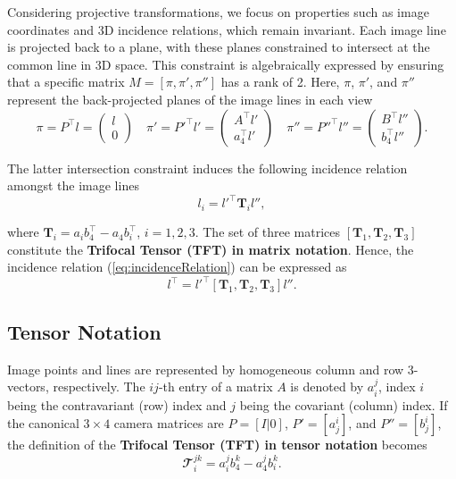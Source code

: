 Considering projective transformations, we focus on properties such as image coordinates and 3D incidence relations, which remain invariant. Each image line is projected back to a plane, with these planes constrained to intersect at the common line in 3D space. This constraint is algebraically expressed by ensuring that a specific matrix \( M = [\pi, \pi', \pi''] \) has a rank of 2. Here, \( \pi \), \( \pi' \), and \( \pi'' \) represent the back-projected planes of the image lines in each view
\begin{equation}
	\pi = P^\top l = \left( \begin{array}{c} l \\ 0 \end{array} \right) \quad
	\pi' = P'^\top l' = \left( \begin{array}{c} A^\top l' \\ a_4^\top l' \end{array} \right) \quad
	\pi'' = P''^\top l'' = \left( \begin{array}{c} B^\top l'' \\ b_4^\top l'' \end{array} \right).
\end{equation}

The latter intersection constraint induces the following incidence relation amongst the image lines
\begin{equation}
	l_i = l'^\top \bm{T}_il'',
	\label{eq:incidenceRelation}
\end{equation}

where \( \bm{T}_i = a_ib_4^\top - a_4b_i^\top \), \( i = 1, 2, 3 \). The set of three matrices \( [\bm{T}_1, \bm{T}_2, \bm{T}_3] \) constitute the \textbf{Trifocal Tensor (TFT) in matrix notation}. Hence, the incidence relation (\ref{eq:incidenceRelation}) can be expressed as
\begin{equation}
	l^\top = l'^\top [\bm{T}_1, \bm{T}_2, \bm{T}_3] l''.
	\label{eq:incidenceRelationMatrix}
\end{equation}

\subsection{Tensor Notation}
Image points and lines are represented by homogeneous column and row 3-vectors, respectively. The \( ij \)-th entry of a matrix \( A \) is denoted by \( a_i^j \), index \( i \) being the contravariant (row) index and \( j \) being the covariant (column) index. If the canonical \( 3 \times 4 \) camera matrices are \( P = [I|0] \), \( P' = [a_j^i] \), and \( P'' = [b_j^i] \), the definition of the \textbf{Trifocal Tensor (TFT) in tensor notation} becomes
\begin{equation}
	\mathbfcal{T}_i^{jk} = a_i^jb_4^k - a_4^jb_i^k.
	\label{eq:tensorDef}
\end{equation}

